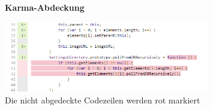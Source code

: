 \documentclass[qualitaetssicherung.tex]{subfiles}
\begin{document}
\begin{itemize}
	\begin{figure}[H]
		\centering
    \textbf{Karma-Abdeckung}\par\medskip
    \includegraphics[width=0.8\textwidth]{Images/karma-example-2.png}
    \caption{Die nicht abgedeckte Codezeilen werden rot markiert}
		\label{karma_example_2}
	\end{figure}
	
\end{itemize}
		
\end{document}
